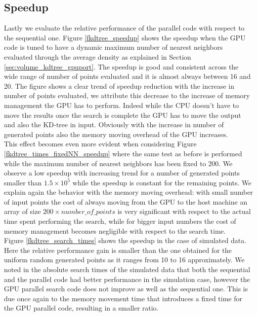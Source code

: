 \subsection{Speedup}
Lastly we evaluate the relative performance of the parallel code with respect to the sequential one.
Figure \ref{fkdtree_speedup} shows the speedup when the GPU code is tuned to have a dynamic maximum number of nearest neighbors evaluated through the average density as explained in Section \ref{sec:volume_kdtree_gpuport}. The speedup is good and consistent across the wide range of number of points evaluated and it is almost always between 16 and 20. The figure shows a clear trend of speedup reduction with the increase in number of points evaluated, we attribute this decrease to the increase of memory management the GPU has to perform. Indeed while the CPU doesn't have to move the results once the search is complete the GPU has to move the output and also the KD-tree in input. Obviously with the increase in number of generated points also the memory moving overhead of the GPU increases.\\
This effect becomes even more evident when considering Figure \ref{fkdtree_times_fixedNN_speedup} where the same test as before is performed while the maximum number of nearest neighbors has been fixed to 200. We observe a low speedup with increasing trend for a number of generated points smaller than $1.5 \times 10^5$ while the speedup is constant for the remaining points. We explain again the behavior with the memory moving overhead: with small number of input points the cost of always moving from the GPU to the host machine an array of size $200 \times number\_of\_points$ is very significant with respect to the actual time spent performing the search, while for bigger input numbers the cost of memory management becomes negligible with respect to the search time.\\
Figure \ref{fkdtree_search_times} shows the speedup in the case of simulated data. Here the relative performance gain is smaller than the one obtained for the uniform random generated points as it ranges from 10 to 16 approximately. We noted in the absolute search times of the simulated data that both the sequential and the parallel code had better performance in the simulation case, however the GPU parallel search code does not improve as well as the sequential one. This is due once again to the memory movement time that introduces a fixed time for the GPU parallel code, resulting in a smaller ratio.\\


